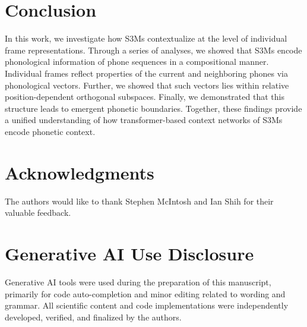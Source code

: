 \documentclass[cameraready]{Interspeech}
\begin{document}
\section{Conclusion}
In this work, we investigate how S3Ms contextualize at the level of individual frame representations.
Through a series of analyses, we showed that S3Ms encode phonological information of phone sequences in a compositional manner.
Individual frames reflect properties of the current and neighboring phones via phonological vectors.
Further, we showed that such vectors lies within relative position-dependent orthogonal subspaces.
Finally, we demonstrated that this structure leads to emergent phonetic boundaries.
Together, these findings provide a unified understanding of how transformer-based context networks of S3Ms encode phonetic context.


\ifcameraready
\section{Acknowledgments}
The authors would like to thank Stephen McIntosh and Ian Shih for their valuable feedback.
\fi

\section{Generative AI Use Disclosure}
Generative AI tools were used during the preparation of this manuscript, primarily for code auto-completion and minor editing related to wording and grammar.
All scientific content and code implementations were independently developed, verified, and finalized by the authors.



\end{document}
